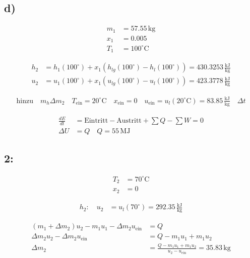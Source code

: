 

\subsection*{d)}

\begin{align*}
    m_1 &= 57.55 \, \text{kg} \\
    x_1 &= 0.005 \\
    T_1 &= 100^\circ \text{C}
\end{align*}

\begin{align*}
    h_2 &= h_1(100^\circ) + x_1 \left( h_{lg}(100^\circ) - h_l(100^\circ) \right) = 430.3253 \, \frac{\text{kJ}}{\text{kg}} \\
    u_2 &= u_1(100^\circ) + x_1 \left( u_{lg}(100^\circ) - u_l(100^\circ) \right) = 423.3778 \, \frac{\text{kJ}}{\text{kg}}
\end{align*}

\begin{align*}
    \text{hinzu} \quad m_h \Delta m_2 \quad T_{\text{ein}} = 20^\circ \text{C} \quad x_{\text{ein}} = 0 \quad u_{\text{ein}} = u_l(20^\circ \text{C}) = 83.85 \, \frac{\text{kJ}}{\text{kg}} \quad \Delta t
\end{align*}


\begin{align*}
    \frac{dE}{dt} &= \text{Eintritt} - \text{Austritt} + \sum Q - \sum W = 0 \\
    \Delta U &= Q \quad Q = 55 \, \text{MJ}
\end{align*}

\subsection*{2:}

\begin{align*}
    T_2 &= 70^\circ \text{C} \\
    x_2 &= 0
\end{align*}

\begin{align*}
    h_2: \quad u_2 &= u_l(70^\circ) = 292.35 \, \frac{\text{kJ}}{\text{kg}}
\end{align*}

\begin{align*}
    (m_1 + \Delta m_2) u_2 - m_1 u_1 - \Delta m_2 u_{\text{ein}} &= Q \\
    \Delta m_2 u_2 - \Delta m_2 u_{\text{ein}} &= Q - m_1 u_1 + m_1 u_2 \\
    \Delta m_2 &= \frac{Q - m_1 u_1 + m_1 u_2}{u_2 - u_{\text{ein}}} = 35.83 \, \text{kg}
\end{align*}